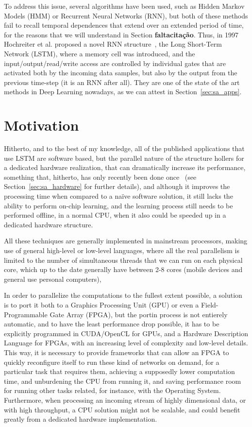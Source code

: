 To address this issue, several algorithms have been used, such as Hidden Markov Models (HMM) or Recurrent Neural Networks (RNN), but both of these methods fail to recall temporal dependences that extend over an extended period of time, for the reasons that we will understand in Section \textbf{faltacitação}. Thus, in 1997 Hochreiter et al. proposed a novel RNN structure~\cite{Hoch97}, the Long Short-Term Network (LSTM), where a memory cell was introduced, and the input/output/read/write access are controlled by individual gates that are activated both by the incoming data samples, but also by the output from the previous time-step (it is an RNN after all). They are one of the state of the art methods in Deep Learning nowadays, as we can attest in Section~\ref{sec:sa_apps}.

\section{Motivation}\label{sec:intro_mot}
Hitherto, and to the best of my knowledge, all of the published applications that use LSTM are software based, but the parallel nature of the structure hollers for a dedicated hardware realization, that can dramatically increase its performance, something that, hitherto, has only recently been done once~\cite{Chang15} (see Section~\ref{sec:sa_hardware} for further details), and although it improves the processing time when compared to a naïve software solution, it still lacks the ability to perform on-chip learning, and the learning process still needs to be performed offline, in a normal CPU, when it also could be speeded up in a dedicated hardware structure.

All these techniques are generally implemented in mainstream processors, making use of general high-level or low-level languages, where all the real parallelism is limited to the number of simultaneous threads that we can run on each physical core, which up to the date generally have between 2-8 cores (mobile devices and general use personal computers), 

In order to parallelize the computations to the fullest extent possible, a solution is to port it both to a Graphics Processing Unit (GPU) or even a Field-Programmable Gate Array (FPGA), but the portin process is not entierely automatic, and to have the least performance drop possible, it has to be explicitly programmed in CUDA/OpenCL for GPUs, and a Hardware Description Language for FPGAs, with an increasing level of complexity and low-level details. This way, it is necessary to provide frameworks that can allow an FPGA to quickly reconfigure itself to run these kind of networks on demand, for a particular task that requires them, achieving a supposedly lower computation time, and unburdening the CPU from running it, and saving performance room for running other tasks related, for instance, with the Operating System. Furthermore, when processing an incoming stream of highly dimensional data, or with high throughput, a CPU solution might not be scalable, and could benefit greatly from a dedicated hardware implementation.

